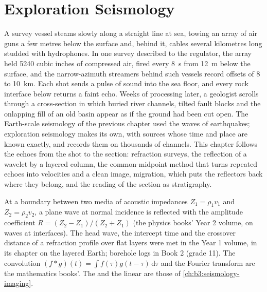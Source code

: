 \chapter{Exploration Seismology}\label{ch:b3:exploration-seismology}

A survey vessel steams slowly along a straight line at sea, towing an array of
air guns a few metres below the surface and, behind it, cables several
kilometres long studded with hydrophones. In one survey described to the
regulator, the array held \num{5240} cubic inches of compressed air, fired every
\qty{8}{s} from \qty{12}{m} below the surface, and the narrow-azimuth streamers
behind such vessels record offsets of 8 to \qty{10}{km}.
Each shot sends a pulse of sound into the sea floor, and every rock interface
below returns a faint echo. Weeks of processing later, a geologist scrolls
through a cross-section in which buried river channels, tilted fault blocks and
the onlapping fill of an old basin appear as if the ground had been cut open.
The Earth-scale seismology of the previous chapter used the waves of
earthquakes; exploration seismology makes its own, with sources whose time and
place are known exactly, and records them on thousands of channels. This
chapter follows the echoes from the shot to the section: refraction surveys,
the reflection of a wavelet by a layered column, the common-midpoint method
that turns repeated echoes into velocities and a clean image, migration, which
puts the reflectors back where they belong, and the reading of the section as
stratigraphy.

\begin{recall}
At a boundary between two media of acoustic impedances $Z_1 = \rho_1v_1$ and
$Z_2 = \rho_2v_2$, a plane wave at normal incidence is reflected with the
amplitude coefficient $R = (Z_2 - Z_1)/(Z_2 + Z_1)$ (the physics books' Year 2
volume, on waves at interfaces). The head wave, the intercept time and the
crossover distance of a refraction profile over flat layers were met in the
Year 1 volume, in its chapter on the layered Earth; borehole logs in Book 2
(grade 11). The convolution $(f*g)(t) = \int f(\tau)g(t - \tau)\,\mathrm d\tau$
and the Fourier transform are the mathematics books'. The  and the
linear  are those of \cref{ch:b3:seismology-imaging}.
\end{recall}

